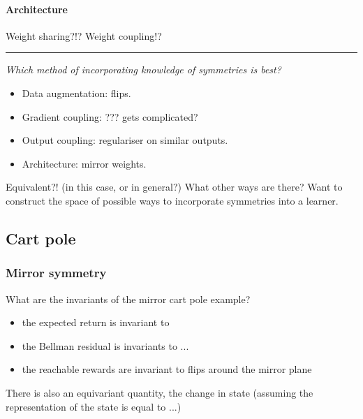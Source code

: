 \paragraph{Architecture}

Weight sharing?!? Weight coupling!?
\cite{Ravanbakhsh2017a,Abdolhosseini}
\cite{Anselmi2019}

\begin{center}\rule{0.5\linewidth}{\linethickness}\end{center}

\begin{displayquote}
\textit{Which method of incorporating knowledge of symmetries is best?}
\end{displayquote}

\begin{itemize}
\tightlist
  \item Data augmentation: flips.
  \item Gradient coupling: ??? gets complicated?
  \item Output coupling: regulariser on similar outputs.
  \item Architecture: mirror weights.
\end{itemize}

Equivalent?! (in this case, or in general?)
What other ways are there? Want to construct the space of possible ways to incorporate symmetries into a learner.


\subsection{Cart pole} \label{game-invariants}

\subsubsection{Mirror symmetry}

What are the invariants of the mirror cart pole example?

\begin{itemize}
	\tightlist
	\item the expected return is invariant to
	\item the Bellman residual is invariants to ...
	\item the reachable rewards are invariant to flips around the mirror plane
\end{itemize}
There is also an equivariant quantity, the change in state (assuming the representation of the state is equal to ...)


